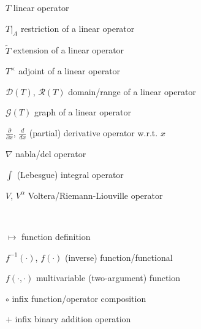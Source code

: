 \documentclass[12pt, oneside]{book}
\begin{document}
\begin{changemargin}{-2cm}{-2cm}
\begin{minipage}[t]{0.6\textwidth}
$T$ \hfill linear operator\

\medskip

$T|_A$ \hfill restriction of a linear operator\

\medskip

$\tilde{T}$ \hfill extension of a linear operator\

\medskip

$T^{\times}$ \hfill adjoint of a linear operator\

\medskip

$\mathscr{D}(T)$, $\mathscr{R}(T)$ \hfill domain/range of a linear operator\

\medskip

$\mathcal{G}(T)$ \hfill graph of a linear operator\

\medskip

$\frac{\partial}{\partial x}$, $\frac{d}{dx}$ \hfill (partial) derivative operator w.r.t. $x$\

\medskip

$\nabla$ \hfill nabla/del operator\

\medskip

$\int$ \hfill (Lebesgue) integral operator\

\medskip

$V$, $V^{\alpha}$ \hfill Voltera/Riemann-Liouville operator\





\end{minipage}
\begin{minipage}[t]{0.05\textwidth}

${}$\\

\end{minipage}
\begin{minipage}[t]{0.6\textwidth}

$\mapsto$ \hfill function definition\

\medskip

$f^{-1}(\cdot)$, $f(\cdot)$ \hfill (inverse) function/functional\

\medskip

$f(\cdot,\cdot)$ \hfill multivariable (two-argument) function\

\medskip

$\circ$ \hfill infix function/operator composition\

\medskip

$+$ \hfill infix binary addition operation\

\medskip


\end{minipage}
\end{changemargin}
\end{document}
